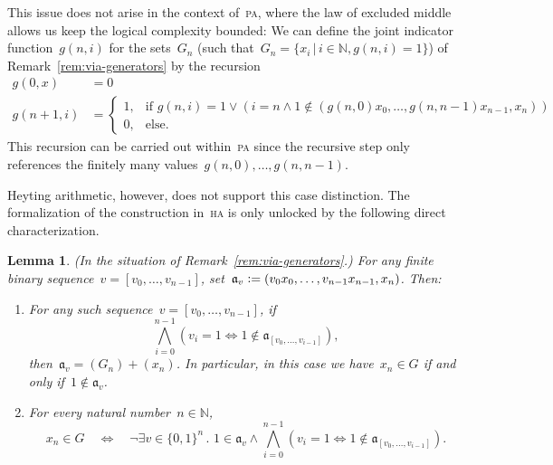 \documentclass[oneside,reqno]{amsart}
\theoremstyle{definition}
\theoremstyle{plain}
\newtheorem{lemma}[defn]{Lemma}
\theoremstyle{remark}
\newcommand{\aaa}{\mathfrak{a}}
\newcommand{\NN}{\mathbb{N}}
\newcommand{\defeq}{\vcentcolon=}
\renewcommand{\_}{\mathpunct{.}\,}
\begin{document}
This issue does not arise in the context of~\textsc{pa}, where the law of
excluded middle allows us keep the logical complexity bounded: We can define
the joint indicator function~$g(n,i)$ for the sets~$G_n$ (such that~$G_n = \{
x_i \,|\, i \in \NN, g(n,i) = 1 \}$) of Remark~\ref{rem:via-generators} by the recursion
\begin{align*}
  g(0,x) &= 0 \\
  g(n+1,i) &= \begin{cases}
    1, & \text{if $g(n,i) = 1 \vee (i = n \wedge 1 \not\in
    (g(n,0)x_0,\ldots,g(n,n-1)x_{n-1},x_n))$} \\
    0, & \text{else.}
  \end{cases}
\end{align*}
This recursion can be carried out within~\textsc{pa} since the recursive step
only references the finitely many values~$g(n,0),\ldots,g(n,n-1)$.

Heyting arithmetic, however, does not support this case distinction. The
formalization of the construction in~\textsc{ha} is only unlocked by the following
direct characterization.

\begin{lemma}\label{lemma:uniform-char}(In the situation of Remark~\ref{rem:via-generators}.)
For any finite binary sequence~$v = [v_0,\ldots,v_{n-1}]$, set~$\aaa_v
\defeq (v_0x_0,\ldots,v_{n-1}x_{n-1},x_n)$. Then:
\begin{enumerate}
\item For any such sequence~$v = [v_0,\ldots,v_{n-1}]$, if
\[ \bigwedge_{i=0}^{n-1} (v_i = 1 \Leftrightarrow 1 \not\in \aaa_{[v_0,\ldots,v_{i-1}]}), \]
then~$\aaa_v = (G_n) + (x_n)$.
In particular, in this case we have~$x_n \in G$ if and only if~$1 \not\in \aaa_v$.
\item For every natural number~$n \in \NN$,
\[ x_n \in G \quad\Longleftrightarrow\quad \neg
  \exists v \in \{0,1\}^n\_
    1 \in \aaa_v \wedge
      \bigwedge_{i=0}^{n-1} (v_i = 1 \Leftrightarrow 1 \not\in \aaa_{[v_0,\ldots,v_{i-1}]}). \]
\end{enumerate}
\end{lemma}
\end{document}
